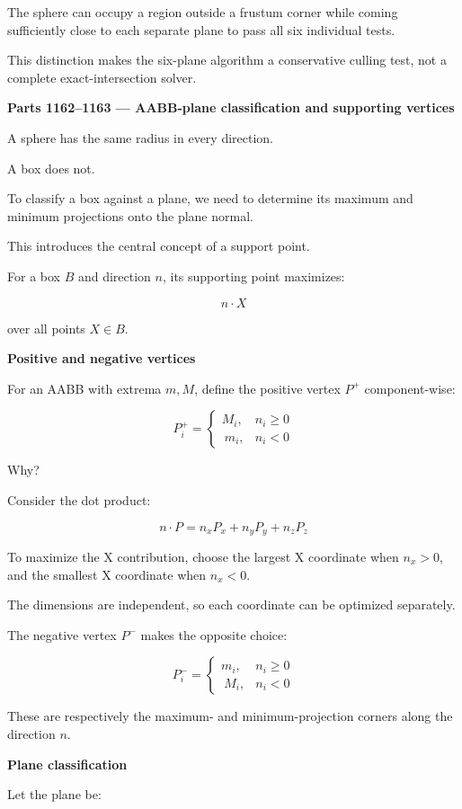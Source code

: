 The sphere can occupy a region outside a frustum corner while coming sufficiently close to each separate plane to pass all six individual tests.

This distinction makes the six-plane algorithm a conservative culling test, not a complete exact-intersection solver.

\textbf{Parts 1162--1163 --- AABB-plane classification and supporting vertices}

A sphere has the same radius in every direction.

A box does not.

To classify a box against a plane, we need to determine its maximum and minimum projections onto the plane normal.

This introduces the central concept of a support point.

For a box \(B\) and direction \(n\), its supporting point maximizes:

\[
n\cdot X
\]

over all points \(X\in B\).

\textbf{Positive and negative vertices}

For an AABB with extrema \(m,M\), define the positive vertex \(P^+\) component-wise:

\[
\boxed{ P_i^+= \begin{cases} M_i,&n_i\ge0\\\ m_i,&n_i<0 \end{cases} }
\]

Why?

Consider the dot product:

\[
n\cdot P=n_xP_x+n_yP_y+n_zP_z
\]

To maximize the X contribution, choose the largest X coordinate when \(n_x>0\), and the smallest X coordinate when \(n_x<0\).

The dimensions are independent, so each coordinate can be optimized separately.

The negative vertex \(P^-\) makes the opposite choice:

\[
\boxed{ P_i^-= \begin{cases} m_i,&n_i\ge0\\\ M_i,&n_i<0 \end{cases} }
\]

These are respectively the maximum- and minimum-projection corners along the direction \(n\).

\textbf{Plane classification}

Let the plane be:

